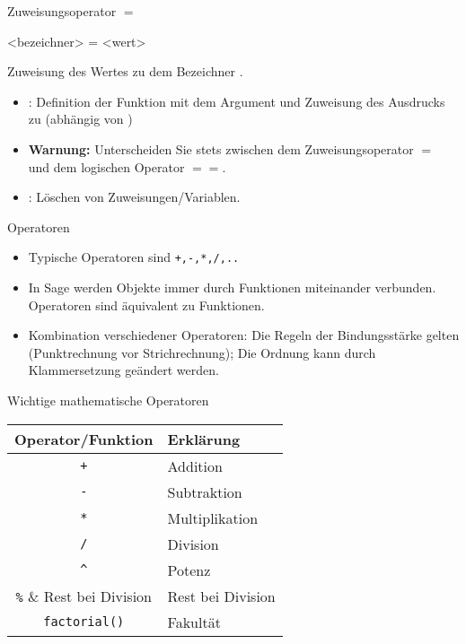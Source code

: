 \documentclass[hyperref={xetex}]{beamer}
\begin{document}
\begin{frame}[fragile]{Zuweisungsoperator $=$}
    \begin{sagein}
<bezeichner> = <wert>
    \end{sagein}   
Zuweisung des Wertes  zu dem Bezeichner .
\begin{itemize}
\item {\color{blue} }: Definition der Funktion  mit dem Argument  und Zuweisung des Ausdrucks  zu (abhängig von )
\item \textbf{Warnung:} Unterscheiden Sie  stets zwischen dem Zuweisungsoperator {\color{blue} $=$} und
dem logischen Operator {\color{blue} $==$}.   
\item {\color{blue} }: Löschen von Zuweisungen/Variablen.
\end{itemize}
\end{frame}


\begin{frame}{Operatoren}
\begin{itemize}
\item Typische \alert{Operatoren} sind \verb~+,-,*,/,..~
\item In Sage werden Objekte immer durch Funktionen miteinander
verbunden. Operatoren sind äquivalent zu Funktionen.
\item Kombination verschiedener Operatoren: Die Regeln der \alert{Bindungsstärke} gelten (Punktrechnung vor Strichrechnung); Die Ordnung kann
durch Klammersetzung geändert werden.
\end{itemize}
\end{frame}

\begin{frame}[fragile]{Wichtige mathematische Operatoren}
\begin{center}
\begin{tabular}{|c|l|}
\hline
Operator/Funktion &  Erklärung\\
\hline
\hline
\verb!+! & Addition \\
\verb!-! & Subtraktion\\
\verb!*! & Multiplikation \\
\verb!/! & Division\\
\verb!^! & Potenz\\
\verb!%! &  Rest bei Division\\
\verb!factorial()! & Fakultät \\
\hline
\end{tabular}
\end{center}
\end{frame}
\end{document}
